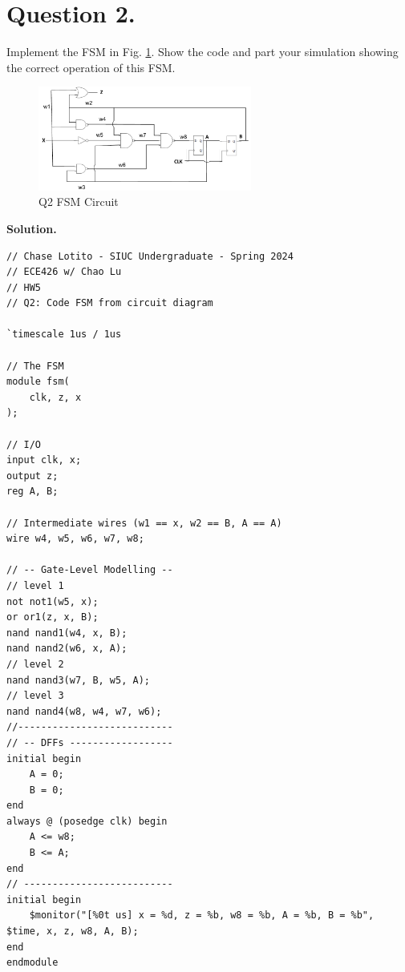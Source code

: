 \documentclass{article}
\begin{document}
\section{Question 2.}

Implement the FSM in Fig. \ref{fig:q2-circuit}. Show the code and part your simulation showing the correct operation of this FSM.


\begin{figure}[!ht] 
    \centering
    \includegraphics[width = 7cm]{q2-circuit.png}
    \caption{Q2 FSM Circuit}
    \label{fig:q2-circuit}
\end{figure}

\textbf{Solution.}

\begin{lstlisting}[caption="q2.v"]
// Chase Lotito - SIUC Undergraduate - Spring 2024
// ECE426 w/ Chao Lu
// HW5
// Q2: Code FSM from circuit diagram

`timescale 1us / 1us

// The FSM
module fsm(
    clk, z, x
);

// I/O
input clk, x;
output z;
reg A, B;

// Intermediate wires (w1 == x, w2 == B, A == A)
wire w4, w5, w6, w7, w8;

// -- Gate-Level Modelling --
// level 1
not not1(w5, x);
or or1(z, x, B);
nand nand1(w4, x, B);
nand nand2(w6, x, A);
// level 2
nand nand3(w7, B, w5, A);
// level 3
nand nand4(w8, w4, w7, w6);
//---------------------------
// -- DFFs ------------------
initial begin
    A = 0;
    B = 0;
end
always @ (posedge clk) begin
    A <= w8;
    B <= A;
end
// --------------------------
initial begin
    $monitor("[%0t us] x = %d, z = %b, w8 = %b, A = %b, B = %b", $time, x, z, w8, A, B);
end
endmodule
\end{lstlisting}
\end{document}

